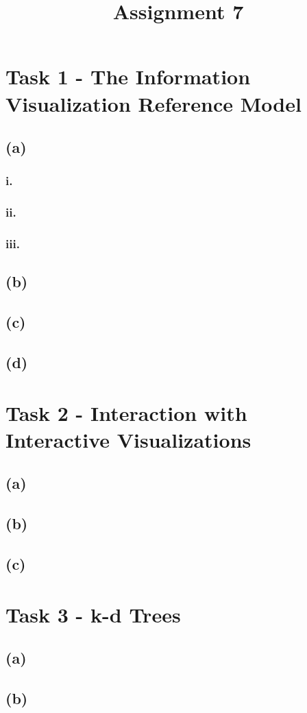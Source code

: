 \documentclass[a4paper]{article}
\date{}
\author{}
\title{\textbf{Assignment 7}}
\begin{document}
\maketitle 
\thispagestyle{fancy}

\section*{Task 1 - The Information Visualization Reference Model}
\subsection*{(a)}
\subsubsection*{i.}
\subsubsection*{ii.}
\subsubsection*{iii.}
\subsection*{(b)}
\subsection*{(c)}
\subsection*{(d)}

\section*{Task 2 - Interaction with Interactive Visualizations}
\subsection*{(a)}
\subsection*{(b)}
\subsection*{(c)}

\section*{Task 3 - k-d Trees}
\subsection*{(a)}
\subsection*{(b)}
\end{document}

